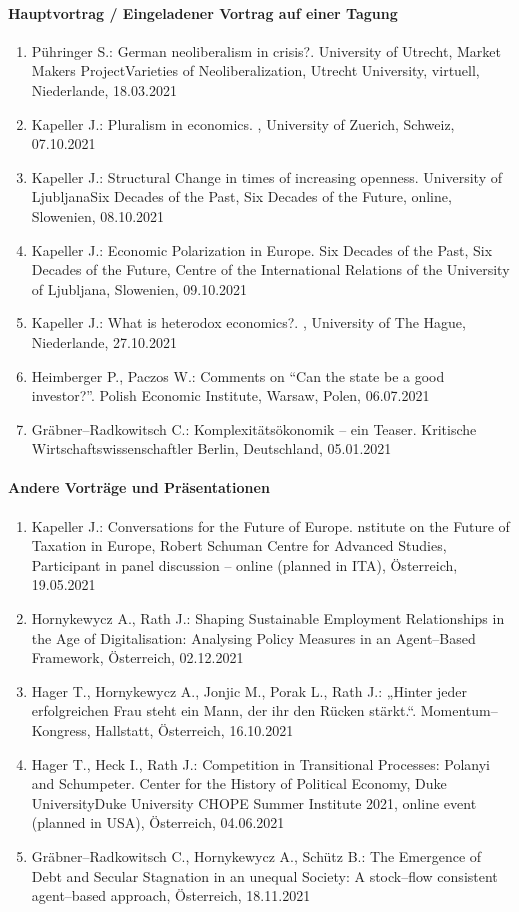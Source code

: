 \paragraph{Hauptvortrag / Eingeladener Vortrag auf einer Tagung}
\begin{enumerate}
	\item Pühringer S.: German neoliberalism in crisis?. University of Utrecht, Market Makers ProjectVarieties of Neoliberalization, Utrecht University, virtuell, Niederlande, 18.03.2021
	\item Kapeller J.: Pluralism in economics. , University of Zuerich, Schweiz, 07.10.2021
	\item Kapeller J.: Structural Change in times of increasing openness. University of LjubljanaSix Decades of the Past, Six Decades of the Future, online, Slowenien, 08.10.2021
	\item Kapeller J.: Economic Polarization in Europe. Six Decades of the Past, Six Decades of the Future, Centre of the International Relations of the University of Ljubljana, Slowenien, 09.10.2021
	\item Kapeller J.: What is heterodox economics?. , University of The Hague, Niederlande, 27.10.2021
	\item Heimberger P., Paczos W.: Comments on “Can the state be a good investor?”. Polish Economic Institute, Warsaw, Polen, 06.07.2021
	\item Gräbner--Radkowitsch C.: Komplexitätsökonomik -- ein Teaser. Kritische Wirtschaftswissenschaftler Berlin, Deutschland, 05.01.2021
\end{enumerate}
\paragraph{Andere Vorträge und Präsentationen}
\begin{enumerate}
	\item Kapeller J.: Conversations for the Future of Europe. nstitute on the Future of Taxation in Europe, Robert Schuman Centre for Advanced Studies, Participant in panel discussion -- online (planned in ITA), Österreich, 19.05.2021
	\item Hornykewycz A., Rath J.: Shaping Sustainable Employment Relationships in the Age of Digitalisation: Analysing Policy Measures in an Agent--Based Framework, Österreich, 02.12.2021
	\item Hager T., Hornykewycz A., Jonjic M., Porak L., Rath J.: „Hinter jeder erfolgreichen Frau steht ein Mann, der ihr den Rücken stärkt.“. Momentum--Kongress, Hallstatt, Österreich, 16.10.2021
	\item Hager T., Heck I., Rath J.: Competition in Transitional Processes: Polanyi and Schumpeter. Center for the History of Political Economy, Duke UniversityDuke University CHOPE Summer Institute 2021, online event (planned in USA), Österreich, 04.06.2021
	\item Gräbner--Radkowitsch C., Hornykewycz A., Schütz B.: The Emergence of Debt and Secular Stagnation in an unequal Society: A stock--flow consistent agent--based approach, Österreich, 18.11.2021
\end{enumerate}

